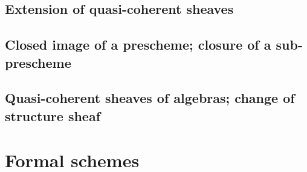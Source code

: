 \documentclass[10pt,oneside]{amsart}
\begin{document}
        \subsection{Extension of quasi-coherent sheaves}
        
        
        \subsection{Closed image of a prescheme; closure of a sub-prescheme}
        
        
        \subsection{Quasi-coherent sheaves of algebras; change of structure sheaf}
        
        

    \section{Formal schemes}
\end{document}
